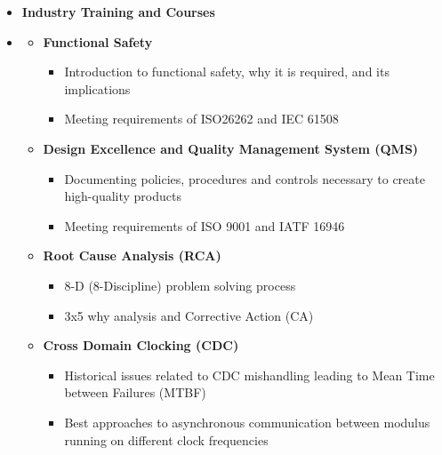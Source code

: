 \begin {itemize}
\begin {itemize}
\begin {itemize}
                Mohsen Hayati, Professor
    \end {itemize}
\end {itemize} \vspace{1cm}
\item [] {\bf \Large  Industry Training and Courses }   \vspace{-1.5em}
\item []  {\bf \hrulefill } 
\begin {itemize}
    \item [$\bullet$] \bf {\mtf \normalsize Functional Safety} \mdseries
        \begin {itemize}
            \item [-] Introduction to functional safety, why it is required, and its implications
            \item [-] Meeting requirements of ISO26262 and IEC 61508
        \end {itemize} \vspace{0.3cm}
    \item [$\bullet$] \bf {\mtf \normalsize Design Excellence and Quality Management System (QMS) } \mdseries    
        \begin {itemize}
             \item [-] Documenting policies, procedures and controls necessary to create high-quality products
            \item [-] Meeting requirements of ISO 9001 and IATF 16946
        \end {itemize}\vspace{0.3cm}
       \item [$\bullet$] \bf {\mtf \normalsize Root Cause Analysis (RCA) } \mdseries
         \begin {itemize}
            \item [-] 8-D (8-Discipline) problem solving process
            \item [-] 3x5 why analysis and  Corrective Action (CA)
        \end {itemize} \vspace{0.3cm}
       \item [$\bullet$] \bf {\mtf \normalsize Cross Domain Clocking (CDC)  } \mdseries
         \begin {itemize}
            \item [-] Historical issues related to CDC mishandling leading to Mean Time between Failures (MTBF) 
            \item [-] Best approaches to asynchronous communication between modulus running on different clock frequencies

\end{itemize}
\end{itemize}
\end{itemize}
